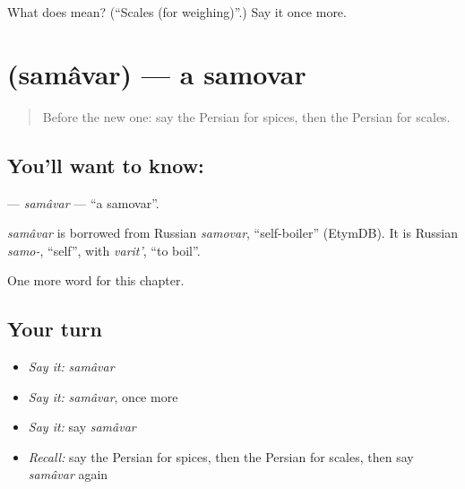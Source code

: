 \begin{tcolorbox}[breakable,colback=teal!4,colframe=teal!35!black,title={Before you move on}]
What does  mean? (\textquotedblleft{}Scales (for weighing)\textquotedblright{}.) Say it once more.
\end{tcolorbox}
\section[\texorpdfstring{\fa{سماور} (samâvar)}{سماور (samâvar)}]{ (samâvar) — a samovar}

\label{lesson:FA-C247-samavar}



\begin{quote}
Before the new one: say the Persian for spices, then the Persian for scales.
\end{quote}

\subsection*{You'll want to know: }
\textbf{} — \emph{samâvar} — \textquotedblleft{}a samovar\textquotedblright{}.

\begin{cousinweb}
\emph{samâvar} is borrowed from Russian \emph{samovar}, \textquotedblleft{}self-boiler\textquotedblright{} (EtymDB). It is Russian \emph{samo-}, \textquotedblleft{}self\textquotedblright{}, with \emph{varit'}, \textquotedblleft{}to boil\textquotedblright{}.
\end{cousinweb}

\begin{grammarlens}[title={What you've built}]
One more word for this chapter.
\end{grammarlens}

\subsection*{Your turn}
\begin{itemize}
\raggedright
  \item \emph{Say it:} \emph{samâvar}
  \item \emph{Say it:} \emph{samâvar}, once more
  \item \emph{Say it:} say \emph{samâvar}
  \item \emph{Recall:} say the Persian for spices, then the Persian for scales, then say \emph{samâvar} again
\end{itemize}

